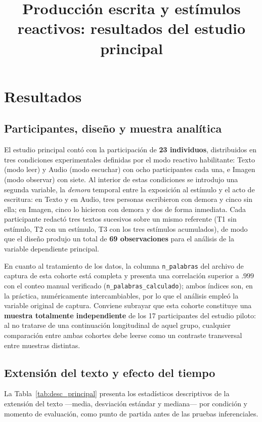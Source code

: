 \documentclass[12pt]{article}
\title{Producción escrita y estímulos reactivos: resultados del estudio principal}
\author{}
\date{}
\begin{document}
	\maketitle
	
	\section{Resultados}
	
	\subsection{Participantes, diseño y muestra analítica}
	
	El estudio principal contó con la participación de \textbf{23 individuos}, distribuidos en tres condiciones experimentales definidas por el modo reactivo habilitante: Texto (modo leer)
	y Audio (modo escuchar) con ocho participantes cada una, e Imagen (modo observar) con siete. Al interior de estas condiciones se introdujo una segunda variable, la \emph{demora} temporal entre la exposición al estímulo y el acto de escritura: en Texto y en Audio, tres personas
	escribieron con demora y cinco sin ella; en Imagen, cinco lo hicieron con demora y dos de forma inmediata. Cada participante redactó tres textos sucesivos sobre un mismo referente (T1 sin estímulo, T2 con un estímulo, T3 con los tres estímulos acumulados), de modo que el
	diseño produjo un total de \textbf{69 observaciones} para el análisis de la variable dependiente principal.
	
	En cuanto al tratamiento de los datos, la columna \texttt{n\_palabras} del archivo de captura de esta cohorte está completa y presenta una correlación superior a $.999$ con el conteo manual verificado (\texttt{n\_palabras\_calculado}); ambos índices son, en la práctica,
	numéricamente intercambiables, por lo que el análisis empleó la variable original de captura.
	Conviene subrayar que esta cohorte constituye una \textbf{muestra totalmente independiente} de los 17 participantes del estudio piloto: al no tratarse de una continuación longitudinal de aquel grupo, cualquier comparación entre ambas cohortes debe leerse como un contraste
	transversal entre muestras distintas.
	
	\subsection{Extensión del texto y efecto del tiempo}
	
	La Tabla~\ref{tab:desc_principal} presenta los estadísticos descriptivos de la extensión del texto —media, desviación estándar y mediana— por condición y momento de evaluación, como punto de partida antes de las pruebas inferenciales.
	
\end{document}
